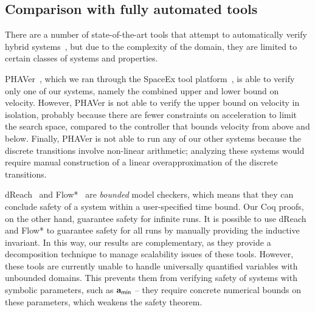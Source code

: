 \subsection{Comparison with fully automated tools}
There are a number of state-of-the-art tools that attempt to automatically
verify hybrid
systems~\cite{PHAVerSTTT08,chen2015flow,kong2015dreach,HyTechCAV97}, but
due to the complexity of the domain, they are limited to certain classes of
systems and properties.

PHAVer~\cite{PHAVerSTTT08}, which we ran through the SpaceEx tool
platform~\cite{frehse2011spaceex-small}, is able to verify only one of our
systems, namely the combined upper and lower bound on velocity.  However,
PHAVer is not able to verify the upper bound on velocity in isolation,
probably because there are fewer constraints on acceleration to limit the
search space, compared to the controller that bounds velocity from above
and below.  Finally, PHAVer is not able to run any of our other systems
because the discrete transitions involve non-linear arithmetic; analyzing
these systems would require manual construction of a linear
overapproximation of the discrete transitions.

dReach~\cite{kong2015dreach} and Flow*~\cite{chen2015flow}
are \emph{bounded} model checkers, which means that they can conclude
safety of a system within a user-specified time bound.  Our Coq proofs, on
the other hand, guarantee safety for infinite runs.  It is possible to use
dReach and Flow* to guarantee safety for all runs by manually providing the
inductive invariant.  In this way, our results are complementary, as they
provide a decomposition technique to manage scalability issues of these
tools.  However, these tools are currently unable to handle universally
quantified variables with unbounded domains.  This prevents them from
verifying safety of systems with symbolic parameters, such as $\mathbf{a}_{\mathsf{min}}$ --
they require concrete numerical bounds on these parameters, which weakens
the safety theorem.
